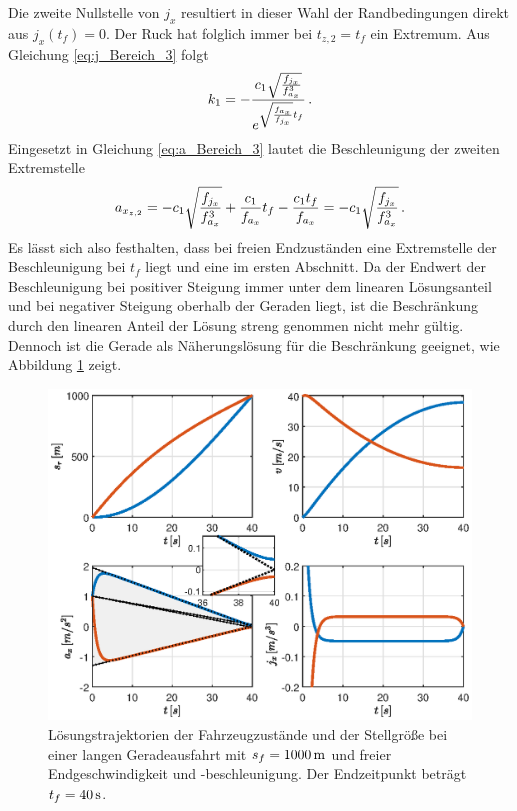 Die zweite Nullstelle von $j_x$ resultiert in dieser Wahl der Randbedingungen direkt aus $j_x(t_f) = 0$. Der Ruck hat folglich immer bei $t_{z,2} = t_f$ ein Extremum. Aus Gleichung \eqref{eq:j_Bereich_3} folgt 
\begin{equation}
k_1 = -\frac{c_1\sqrt{\frac{f_{j_x}}{f_{a_x}^3}}}{e^{\sqrt{\frac{f_{a_x}}{f_{j_x}}}t_f}}\,.
\end{equation}
Eingesetzt in Gleichung \eqref{eq:a_Bereich_3} lautet die Beschleunigung der zweiten Extremstelle
\begin{equation}
a_{x_{z,2}} = -c_1\sqrt{\frac{f_{j_x}}{f_{a_x}^3}} + \frac{c_1}{f_{a_x}}t_f - \frac{c_1t_f}{f_{a_x}} = -c_1\sqrt{\frac{f_{j_x}}{f_{a_x}^3}}\,. 
\end{equation}
Es lässt sich also festhalten, dass bei freien Endzuständen eine Extremstelle der Beschleunigung bei $t_f$ liegt und eine im ersten Abschnitt. Da der Endwert der Beschleunigung bei positiver Steigung immer unter dem linearen Lösungsanteil und bei negativer Steigung oberhalb der Geraden liegt, ist die Beschränkung durch den linearen Anteil der Lösung streng genommen nicht mehr gültig. Dennoch ist die Gerade als Näherungslösung für die Beschränkung geeignet, wie Abbildung \ref{fig:vf_af_frei} zeigt. 
\begin{figure}[h] 
	\centering
	\includegraphics[width=\linewidth]{./Bilder/Ergebnisse/Geradeausfahrt/vf_af_frei_mit_zoom.eps}
	\caption{Lösungstrajektorien der Fahrzeugzustände und der Stellgröße bei einer langen Geradeausfahrt mit $s_f=1000\,\mathrm{m}$ und freier Endgeschwindigkeit und -beschleunigung. Der Endzeitpunkt beträgt $t_f = 40\,\mathrm{s}$.}
	\label{fig:vf_af_frei}
\end{figure} 
